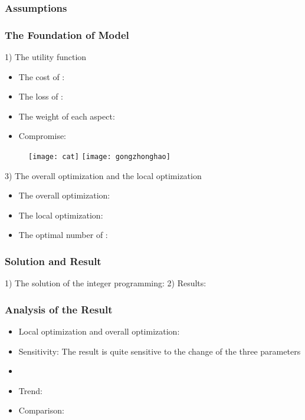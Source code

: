 \documentclass{apmcmthesis}
\begin{document}
\subsubsection{Assumptions}


\subsubsection{The Foundation of Model}
1) The utility function

\begin{itemize}
\item The cost of       :
\item The loss of       :
\item The weight of each aspect:
\item Compromise:
\end{itemize}



\begin{figure}[!ht]
  \centering
  \texttt{[image: cat]}  \quad  \texttt{[image: gongzhonghao]}
  \caption{}\label{cat1}
\end{figure}



3) The overall optimization and the local optimization

\begin{itemize}
\item The overall optimization:
\item The local optimization:
\item The optimal number of        :
\end{itemize}



\subsubsection{Solution and Result}
1) The solution of the integer programming:
2) Results:
\subsubsection{Analysis of the Result}
\begin{itemize}
\item Local optimization and overall optimization:
\item Sensitivity: The result is quite sensitive to the change of the three parameters
\item
\item Trend:
\item Comparison:
\end{itemize}
\end{document}
